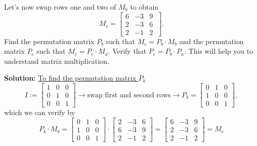  \begin{example}
\label{ex:SolveUsingLu02} 
 Let's now swap rows one and two of $M_b$ to obtain
 $$M_c =  \left[ \begin{array}{rrr}  6 & -3& 9 \\  2 & -3 & 6\\ 2 & -1 & 2 \end{array}\ \right]. $$
Find the permutation matrix $P_b$ such that $M_c = P_b \cdot M_b$ and the permutation matrix $P_c$ such that $M_c = P_c \cdot M_a$. Verify that $P_c = P_b \cdot P_a$. This will help you to understand matrix multiplication.
\end{example}

\textbf{Solution:} \underline{To find the permutation matrix $P_b$} \\
 $$I:=\left[ \begin{array}{rrr} 1 & 0 & 0 \\ 0 & 1 & 0 \\ 0 & 0 & 1\end{array} \right] \rightarrow \text{swap first and second rows} \rightarrow P_b = \left[ \begin{array}{rrr} 0 & 1 & 0 \\ 1 & 0 & 0 \\ 0 & 0 & 1\end{array} \right],$$ 
 which we can verify by
 $$P_b \cdot M_b = \left[ \begin{array}{rrr}0 & 1 & 0 \\ 1 & 0 & 0 \\ 0 & 0 & 1\end{array} \right] \cdot \left[ \begin{array}{rrr}2 & -3 & 6 \\ 6 & -3 & 9 \\ 2 & -1 & 2\end{array} \right] = \left[ \begin{array}{rrr}6 & -3 & 9 \\ 2 & -3 & 6 \\ 2 & -1 & 2\end{array} \right] = M_c$$
 
